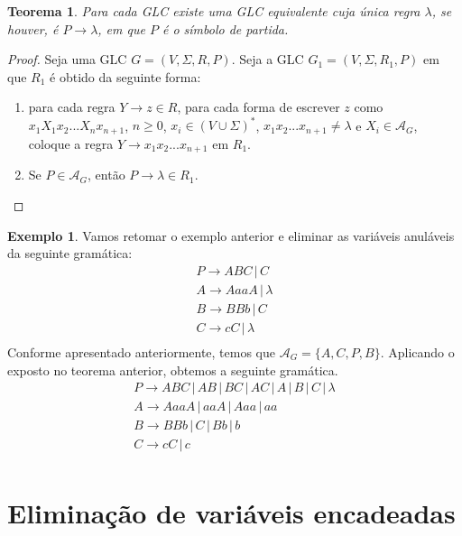 \documentclass[a4paper]{article}
\newtheorem{Theorem}{Teorema}
\theoremstyle{definition}
\newtheorem{Example}{Exemplo}
\begin{document}
  \begin{Theorem}
    Para cada GLC existe uma GLC equivalente cuja única regra $\lambda$, se
    houver, é $P \to \lambda$, em que $P$ é o símbolo de partida.
  \end{Theorem}
  \begin{proof}
    Seja uma GLC $G = (V,\Sigma,R,P)$. Seja a GLC $G_1=(V,\Sigma,R_1,P)$ em que
    $R_1$ é obtido da seguinte forma:
    \begin{enumerate}
       \item para cada regra $Y \to z \in R$, para cada forma de escrever $z$
         como $x_1X_1x_2...X_nx_{n+1}$, $n \geq 0$, $x_i\in(V\cup\Sigma)^*$,
         $x_1x_2...x_{n+1} \neq \lambda$ e $X_i \in \mathcal{A}_G$, coloque a regra
         $Y \to x_1x_2...x_{n+1}$ em $R_1$.
       \item Se $P\in \mathcal{A}_G$, então $P \to \lambda \in R_1$.
    \end{enumerate}
  \end{proof}

  \begin{Example}
    Vamos retomar o exemplo anterior e eliminar as variáveis anuláveis da
    seguinte gramática:
    \[
      \begin{array}{l}
        P \to ABC \,|\, C\\
        A \to AaaA \,|\, \lambda\\
        B \to BBb \,|\,C \\
        C \to cC \,|\, \lambda\\
      \end{array}
    \]
    Conforme apresentado anteriormente, temos que $\mathcal{A}_G=\{A,C,P,B\}$.
    Aplicando o exposto no teorema anterior, obtemos a seguinte gramática.
    \[
      \begin{array}{l}
        P \to ABC \,|\, AB\,|\, BC\,|\, AC\,|\, A \,|\, B \,|\,C\,|\, \lambda\\
        A \to AaaA \,|\, aaA\,|\,Aaa\,|\,aa\\
        B \to BBb \,|\,C \,|\,Bb\,|\,b\\
        C \to cC \,|\, c \\
      \end{array}
    \]    
  \end{Example}

  \section{Eliminação de variáveis encadeadas}
\end{document}
